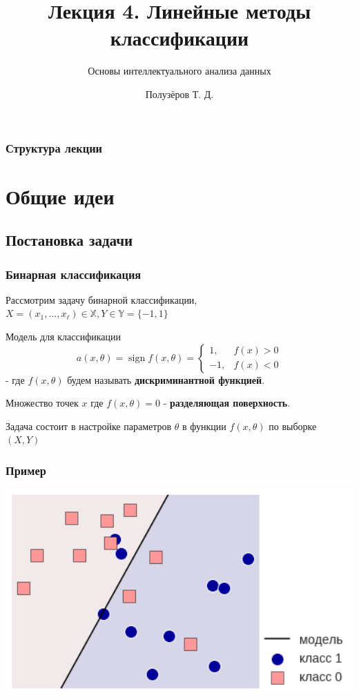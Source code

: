 \documentclass{beamer}
\title[Линейные методы классификации]{Лекция 4. Линейные методы классификации}
\subtitle{Основы интеллектуального анализа данных}
\author{Полузёров Т. Д.}
\institute{БГУ ФПМИ}
\date{}
\DeclareMathOperator{\sign}{sign}
\begin{document}
	
	\begin{frame}
		\titlepage
	\end{frame}
	
	\begin{center}
		\frametitle{Структура лекции}
		\tableofcontents	
	\end{center}
	
	\section{Общие идеи}
	
	\subsection{Постановка задачи}
	
	\begin{frame}
		\frametitle{Бинарная классификация}
		Рассмотрим задачу бинарной классификации, $X=(x_1, ..., x_{\ell}) \in \mathbb{X}, Y \in \mathbb{Y} = \{-1, 1\}$
		
		\vspace{5pt}
		
		Модель для классификации
		\[
		a(x, \theta) 
		= \sign f(x, \theta)
		=
		\begin{cases}
			1,& f(x) > 0 \\
			-1,& f(x) < 0
		\end{cases}
		\]
		- где $f(x, \theta)$
		будем называть \textbf{дискриминантной функцией}.
		
		\vspace{5pt}
		
		Множество точек $x$ где $f(x, \theta) = 0$ - \textbf{разделяющая поверхность}.
		
		\vspace{5pt}
		
		Задача состоит в настройке параметров $\theta$ в функции $f(x, \theta)$ по выборке $(X, Y)$
	\end{frame} 
	
	\begin{frame}
		\frametitle{Пример}
		\includegraphics[width=1\textwidth]{img/bin_class}
	\end{frame}
\end{document}

